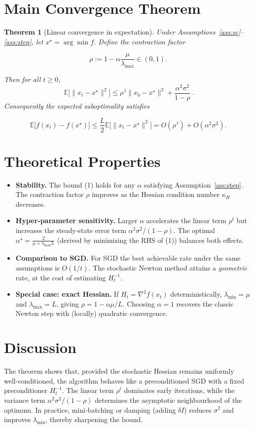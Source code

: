 \documentclass[11pt]{article}
\newtheorem{theorem}{Theorem}
\newcommand{\E}{\mathbb{E}}
\begin{document}
\section*{Main Convergence Theorem}
\begin{theorem}[Linear convergence in expectation]\label{thm:linear}
Under Assumptions~\ref{ass:sc}–\ref{ass:step}, let $x^{\star}=\arg\min f$.  
Define the contraction factor  

\[
\rho:=1-\alpha\frac{\mu}{\lambda_{\max}}\in(0,1).
\]

Then for all $t\ge0$,
\[
\boxed{\;
\E\big[\|x_{t}-x^{\star}\|^{2}\big]\le\rho^{\,t}\|x_{0}-x^{\star}\|^{2}
+\frac{\alpha^{2}\sigma^{2}}{1-\rho}\;
}.
\tag{1}
\]
Consequently the expected suboptimality satisfies  

\[
\E\big[f(x_{t})-f(x^{\star})\big]\le
\frac{L}{2}\E\big[\|x_{t}-x^{\star}\|^{2}\big]
=O(\rho^{\,t})+O(\alpha^{2}\sigma^{2}).
\]
\end{theorem}

\section*{Theoretical Properties}
\begin{itemize}[leftmargin=*]
\item \textbf{Stability.} The bound (1) holds for any $\alpha$ satisfying Assumption~\ref{ass:step}. The contraction factor $\rho$ improves as the Hessian condition number $\kappa_{H}$ decreases.
\item \textbf{Hyper‑parameter sensitivity.} Larger $\alpha$ accelerates the linear term $\rho^{t}$ but increases the steady‑state error term $\alpha^{2}\sigma^{2}/(1-\rho)$. The optimal $\alpha^{\star}= \frac{2}{\mu+\lambda_{\max}L}$ (derived by minimizing the RHS of (1)) balances both effects.
\item \textbf{Comparison to SGD.} For SGD the best achievable rate under the same assumptions is $O(1/t)$. The stochastic Newton method attains a \emph{geometric} rate, at the cost of estimating $H_{t}^{-1}$.
\item \textbf{Special case: exact Hessian.} If $H_{t}=\nabla^{2}f(x_{t})$ deterministically, $\lambda_{\min}=\mu$ and $\lambda_{\max}=L$, giving $\rho=1-\alpha\mu/L$. Choosing $\alpha=1$ recovers the classic Newton step with (locally) quadratic convergence.
\end{itemize}

\section*{Discussion}
The theorem shows that, provided the stochastic Hessian remains uniformly well‑conditioned, the algorithm behaves like a preconditioned SGD with a fixed preconditioner $H_{t}^{-1}$. The linear term $\rho^{t}$ dominates early iterations, while the variance term $\alpha^{2}\sigma^{2}/(1-\rho)$ determines the asymptotic neighbourhood of the optimum. In practice, mini‑batching or damping (adding $\delta I$) reduces $\sigma^{2}$ and improves $\lambda_{\min}$, thereby sharpening the bound.
\end{document}
